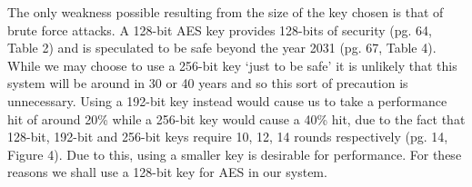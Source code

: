 \documentclass[12pt, titlepage]{article}
\begin{document}
The only weakness possible resulting from the size of the key chosen is that of brute force attacks. A 128-bit AES key provides 128-bits of security (pg. 64, Table 2) and is speculated to be safe beyond the year 2031 (pg. 67, Table 4).\cite{nistKeys}
While we may choose to use a 256-bit key `just to be safe' it is unlikely that this system will be around in 30 or 40 years and so this sort of precaution is unnecessary. Using a 192-bit key instead would cause us to take a performance hit of around 20\% while a 256-bit key would cause a 40\% hit, due to the fact that 128-bit, 192-bit and 256-bit keys require 10, 12, 14 rounds respectively (pg. 14, Figure 4)\cite{announcingAES}. Due to this, using a smaller key is desirable for performance.
\newline For these reasons we shall use a 128-bit key for AES in our system.
\end{document}
